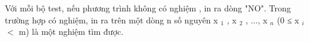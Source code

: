 Với mỗi bộ test, nếu phương trình không có nghiệm , in ra dòng "NO". Trong trường hợp có nghiệm, in ra trên một dòng n số nguyên x $_ 1 $ , x $_ 2 $ , ..., x $_ n $ (0 ≤ x $_ i $ $<$ m) là một nghiệm tìm được.